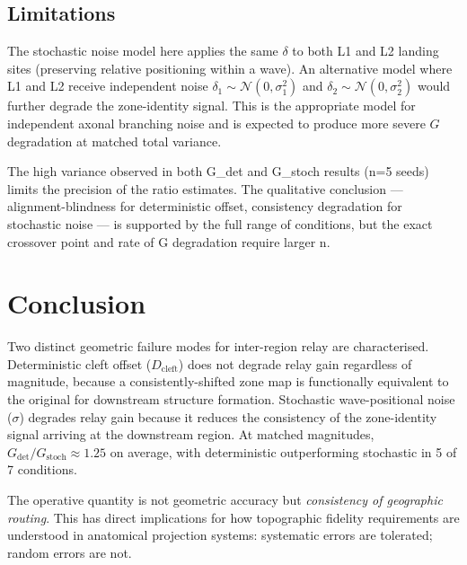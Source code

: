 \documentclass[11pt]{article}
\begin{document}
\subsection{Limitations}

The stochastic noise model here applies the same $\delta$ to both L1
and L2 landing sites (preserving relative positioning within a wave).
An alternative model where L1 and L2 receive independent noise
$\delta_1 \sim \mathcal{N}(0,\sigma_1^2)$ and
$\delta_2 \sim \mathcal{N}(0,\sigma_2^2)$ would further degrade the
zone-identity signal.
This is the appropriate model for independent axonal branching noise
and is expected to produce more severe $G$ degradation at matched
total variance.

The high variance observed in both G\_det and G\_stoch results (n=5 seeds)
limits the precision of the ratio estimates.
The qualitative conclusion --- alignment-blindness for deterministic
offset, consistency degradation for stochastic noise --- is supported by
the full range of conditions, but the exact crossover point and rate of
G degradation require larger n.

\section{Conclusion}

Two distinct geometric failure modes for inter-region relay are
characterised.
Deterministic cleft offset ($D_\mathrm{cleft}$) does not degrade relay
gain regardless of magnitude, because a consistently-shifted zone map is
functionally equivalent to the original for downstream structure
formation.
Stochastic wave-positional noise ($\sigma$) degrades relay gain because
it reduces the consistency of the zone-identity signal arriving at the
downstream region.
At matched magnitudes, $G_\mathrm{det}/G_\mathrm{stoch} \approx 1.25$
on average, with deterministic outperforming stochastic in 5 of 7
conditions.

The operative quantity is not geometric accuracy but
\emph{consistency of geographic routing}.
This has direct implications for how topographic fidelity requirements
are understood in anatomical projection systems: systematic errors are
tolerated; random errors are not.
\end{document}
